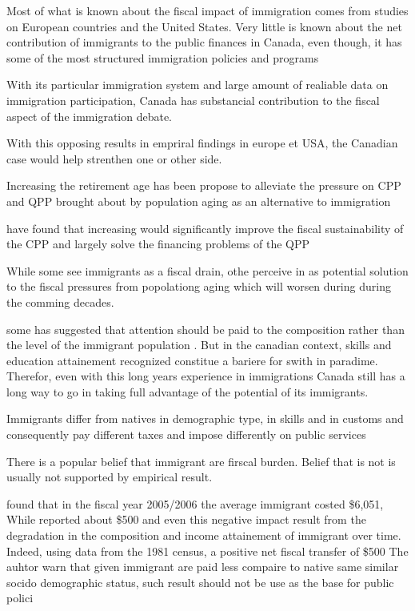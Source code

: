   Most of what is known about the fiscal impact of immigration comes from studies on European countries and the United States. Very little is known about the net contribution of immigrants to the public finances in Canada, even though, it has some of the most structured immigration policies and programs

  With its particular immigration system and large amount of realiable data on immigration participation, Canada has substancial contribution to the fiscal aspect of the immigration debate.

  With this opposing results in empriral findings in europe et USA, the Canadian case would help strenthen one or other side.

  Increasing the retirement age has been propose  to alleviate the pressure on CPP and QPP brought about by population aging as an alternative to immigration \citep{Hering:2010tz}

  \citep{Hering:2010tz} have found that increasing would significantly improve the fiscal sustainability of the CPP and largely solve the financing problems of the QPP

  While some see immigrants as a fiscal drain, othe perceive in as potential solution to the fiscal pressures from popolationg aging \citep{RePEc:nbr:nberch:10849} which will worsen during during the comming decades.

  some has suggested that attention should be paid to the composition rather than the level of the immigrant population \citep{RePEc:nbr:nberch:10849}. But in the canadian context, skills and education attainement recognized constitue a bariere for swith in paradime. Therefor, even with this long years experience in immigrations Canada still has a long way to go in taking full advantage of the potential of its immigrants.








  Immigrants differ from natives in demographic type, in skills and in customs and consequently pay different taxes and impose differently on public services \citep{Preston:2014uw}

  There is a popular belief that immigrant are firscal burden. Belief that is not is usually not supported by empirical result.

  \citep{Grubel:2012wo} found that in the fiscal year 2005/2006 the average immigrant costed \$6,051,  While \citep{Javdani:2013gu} reported about \$500 and even this negative impact result from the degradation in the composition and income attainement of immigrant over time. Indeed, using data from the 1981 census, \citep{Akbari:1989fh} a positive net fiscal transfer of \$500
  The auhtor warn that given immigrant are paid less compaire to native same similar socido demographic status, such result should not be use as the base for public polici

